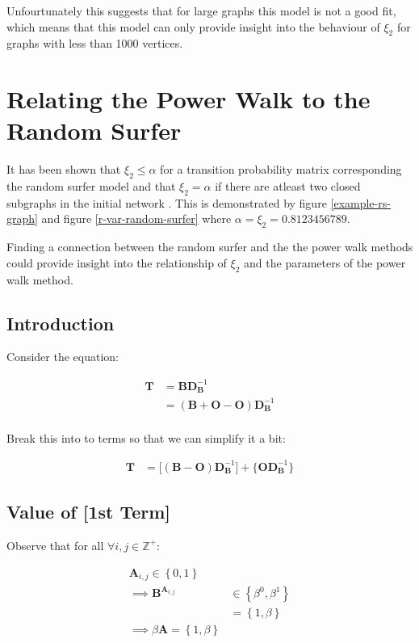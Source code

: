 \documentclass[11pt]{report}
\begin{document}
Unfourtunately this suggests that for large graphs this model is not a good fit,
which means that this model can only provide insight into the behaviour of
\(\xi_{2}\) for graphs with less than 1000 vertices.

\section{Relating the Power Walk to the Random Surfer}
\label{relate-to-random-surfer}
It has been shown that \(\xi_{2} \leq \alpha\) for a transition probability matrix corresponding the random surfer model and that \(\xi_{2} = \alpha\) if there are atleast two closed subgraphs in the initial network \cite{haveliwalaSecondEigenvalueGoogle2003}. This is demonstrated by figure \ref{example-rs-graph} and figure \ref{r-var-random-surfer} where \(\alpha = \xi_{2} = 0.8123456789\).

Finding a connection between the random surfer and the the power walk methods could provide insight into the relationship of \(\xi_{2}\) and the parameters of the power walk method.

\subsection{Introduction}
\label{sec:org07b66b7}
Consider the equation:


\begin{align*}
\mathbf{T}&= \mathbf{B}\mathbf{D}_{\mathbf{B}}^{- 1} \\
&= \left( \mathbf{B}+  \mathbf{O} - \mathbf{O} \right) \mathbf{D}_{\mathbf{B}}^{- 1} \\
\end{align*}


Break this into to terms so that we can simplify it a bit:


\begin{align*}
    \mathbf{T} &= \Bigg[ \left( \mathbf{B}- \mathbf{O} \right)\mathbf{D}_{\mathbf{B}}^{- 1} \Bigg] + \Bigg\{  \mathbf{O}\mathbf{D}_{\mathbf{B}}^{- 1} \Bigg\}
\end{align*}
\subsection{Value of [1st Term]}
\label{value-of-1st-term}
Observe that for all \(\forall i,j\in \mathbb{Z}^+\):


\begin{align*}
\mathbf{A}_{i, j} \in \left\{0, 1\right\} \\
\implies  \mathbf{B}^{\mathbf{A}_{i, j}} &\in \left\{\beta^0, \beta^1\right\} \\
                     &= \left\{1, \beta \right\}  \\
                      \implies  \beta \mathbf{A} = \left\{1, \beta \right\}
\end{align*}
\end{document}
